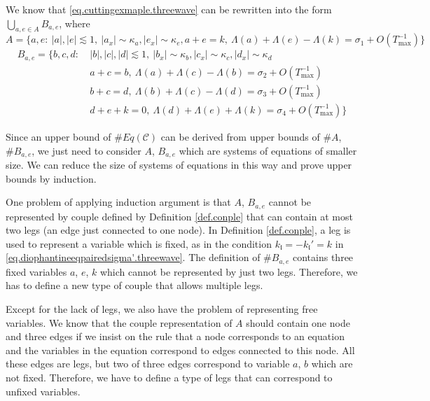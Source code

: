We know that \eqref{eq.cuttingexmaple.threewave} can be rewritten into the form $\bigcup_{a,e\in A} B_{a,e}$, where
\begin{equation}\label{eq.couplequationA.threewave}
    A=\{a, e:\ |a|,|e|\lesssim 1,\ |a_x|\sim \kappa_{a},|e_x|\sim \kappa_{e}, a+e=k,\ \Lambda(a) + \Lambda(e) - \Lambda(k) =\sigma_{1} + O(T^{-1}_{\text{max}})\}
\end{equation}
\begin{equation}\label{eq.couplequationB.threewave}
    \begin{split}
        B_{a,e}=\{b, c, d:\ &|b|,|c|,|d|\lesssim 1,\ |b_x|\sim \kappa_{b},|c_x|\sim \kappa_{c},|d_x|\sim \kappa_{d}
        \\
        &a+c=b,\ \Lambda(a) + \Lambda(c) - \Lambda(b) =\sigma_{2} + O(T^{-1}_{\text{max}})
        \\
        &b+c=d,\ \Lambda(b) + \Lambda(c) - \Lambda(d) =\sigma_{3} + O(T^{-1}_{\text{max}})
        \\
        &d+e+k=0,\ \Lambda(d) + \Lambda(e) + \Lambda(k) =\sigma_{4} + O(T^{-1}_{\text{max}})\}
    \end{split}    
\end{equation}

Since an upper bound of $\# Eq(\mathcal{C})$ can be derived from upper bounds of $\# A$, $\# B_{a,e}$, we just need to consider $A$, $B_{a,e}$ which are systems of equations of smaller size. We can reduce the size of systems of equations in this way and prove upper bounds by induction.

One problem of applying induction argument is that $A$, $B_{a,e}$ cannot be represented by couple defined by Definition \ref{def.conple} that can contain at most two legs (an edge just connected to one node). In Definition \ref{def.conple}, a leg is used to represent a variable which is fixed, as in the condition $k_{\mathfrak{l}} = - k_{\mathfrak{l}}'= k$ in \eqref{eq.diophantineeqpairedsigma'.threewave}. The definition of $\# B_{a,e}$ contains three fixed variables $a$, $e$, $k$ which cannot be represented by just two legs. Therefore, we has to define a new type of couple that allows multiple legs.

Except for the lack of legs, we also have the problem of representing free variables. We know that the couple representation of $A$ should contain one node and three edges if we insist on the rule that a node corresponds to an equation and the variables in the equation correspond to edges connected to this node. All these edges are legs, but two of three edges correspond to variable $a$, $b$ which are not fixed. Therefore, we have to define a type of legs that can correspond to unfixed variables.

